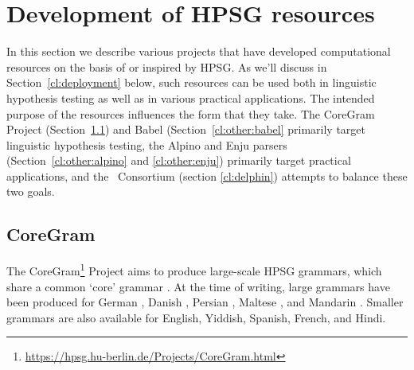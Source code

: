 \documentclass[output=paper,nonflat]{langsci/langscibook}
\begin{document}






\section{Development of HPSG resources}
\label{cl:resources}

In this section we describe various projects that have developed computational resources on the basis of or inspired by HPSG.
As we'll discuss in Section~\ref{cl:deployment} below,
such resources can be used both in linguistic hypothesis testing as well as in various practical applications.
The intended purpose of the resources influences the form that they take.
The CoreGram Project (Section~\ref{cl:coregram}) and Babel (Section~\ref{cl:other:babel} primarily target linguistic hypothesis testing,
the Alpino and Enju parsers (Section~\ref{cl:other:alpino} and \ref{cl:other:enju}) primarily target practical applications,
and the \delphin\ Consortium (section \ref{cl:delphin}) attempts to balance these two goals.


\subsection{CoreGram}
\label{cl:coregram}

The CoreGram\footnote{
	\url{https://hpsg.hu-berlin.de/Projects/CoreGram.html}
} Project
aims to produce large-scale HPSG grammars,
which share a common `core' grammar \citep{MuellerCoreGram}.
At the time of writing, large grammars have been produced for
German \citep{MuellerLehrbuch1},
Danish \citep{MOeDanish-language},
Persian \citep{MG2010a},
Maltese \citep{MuellerMalteseSketch},
and Mandarin \citep{ML2013a}.
Smaller grammars are also available for English, Yiddish, Spanish, French, and Hindi.
\end{document}
